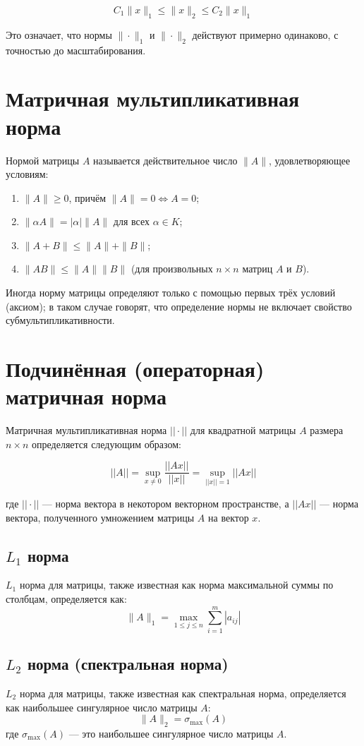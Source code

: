\documentclass{article}
\begin{document}
\[
C_1 \| x \|_1 \leq \| x \|_2 \leq C_2 \| x \|_1
\]

Это означает, что нормы $\| \cdot \|_1$ и $\| \cdot \|_2$ действуют примерно одинаково, с точностью до масштабирования.

\section{Матричная мультипликативная норма}
Нормой матрицы \(A\) называется действительное число \(\|A\|\), удовлетворяющее условиям:
\begin{enumerate}
    \item \(\|A\| \ge 0\), причём \(\|A\| = 0 \iff A = 0\);
    \item \(\|\alpha A\| = |\alpha| \|A\|\) для всех \(\alpha \in K\);
    \item \(\|A + B\| \le \|A\| + \|B\|\);
    \item \(\|AB\| \le \|A\| \|B\|\) (для произвольных \(n \times n\) матриц \(A\) и \(B\)).
\end{enumerate}
Иногда норму матрицы определяют только с помощью первых трёх условий (аксиом); в таком случае говорят, что определение нормы не включает свойство субмультипликативности.
\section{Подчинённая (операторная) матричная норма}
Матричная мультипликативная норма $||\cdot||$ для квадратной матрицы $A$ размера $n \times n$ определяется следующим образом:

\[
||A|| = \sup_{x \neq 0} \frac{||Ax||}{||x||} = \sup_{||x|| = 1} ||Ax||
\]

где $||\cdot||$ — норма вектора в некотором векторном пространстве, а $||Ax||$ — норма вектора, полученного умножением матрицы $A$ на вектор $x$.

\subsection{$L_1$ норма}
$L_1$ норма для матрицы, также известная как норма максимальной суммы по столбцам, определяется как:
\[
\|A\|_1 = \max_{1 \leq j \leq n} \sum_{i=1}^m |a_{ij}|
\]

\subsection{$L_2$ норма (спектральная норма)}
$L_2$ норма для матрицы, также известная как спектральная норма, определяется как наибольшее сингулярное число матрицы $A$:
\[
\|A\|_2 = \sigma_{\max}(A)
\]
где $\sigma_{\max}(A)$ — это наибольшее сингулярное число матрицы $A$.
\end{document}
